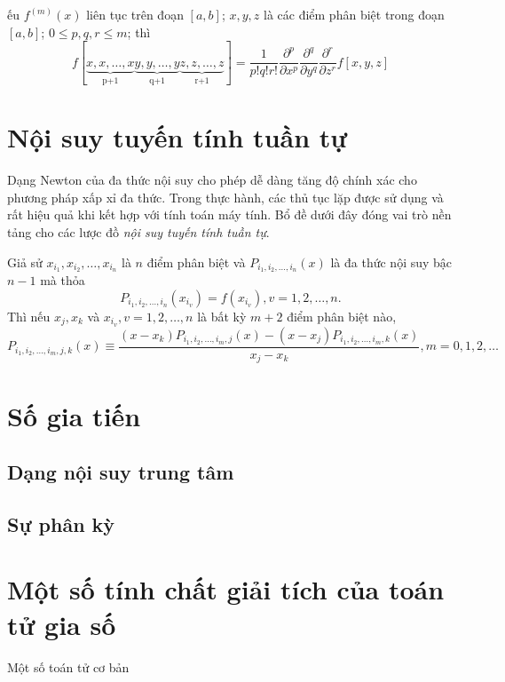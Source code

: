 \begin{coro}
    ếu $f^{(m)}(x)$ liên tục trên đoạn $[a, b]$; $x, y, z$ là các điểm phân biệt trong đoạn $[a,b]$; $0 \leq p,q,r \leq m$; thì
    \begin{equation}
        f[\underset{\text{p+1}}{\underbrace{x,x,\dots,x}}\underset{\text{q+1}}{\underbrace{y,y,\dots,y}}\underset{\text{r+1}}{\underbrace{z,z,\dots,z}}] = \frac{1}{p!q!r!}\frac{\partial^p}{\partial x^p}\frac{\partial^q}{\partial y^q}\frac{\partial^r}{\partial z^r}f[x,y,z]
    \end{equation}
\end{coro}

\section{Nội suy tuyến tính tuần tự}

Dạng Newton của đa thức nội suy cho phép dễ dàng tăng độ chính xác cho phương pháp xấp xỉ đa thức. Trong thực hành, các thủ tục lặp được sử dụng và rất hiệu quả khi kết hợp với tính toán máy tính. Bổ đề dưới đây đóng vai trò nền tảng cho các lược đồ \emph{nội suy tuyến tính tuần tự}.

\begin{lemma}
    Giả sử $x_{i_1}, x_{i_2}, \dots, x_{i_n}$ là $n$ điểm phân biệt và $P_{i_1, i_2, \dots, i_n}(x)$ là đa thức nội suy bậc $n-1$ mà thỏa
    \begin{equation}
        P_{i_1, i_2, \dots, i_n}(x_{i_v}) = f(x_{i_v}), v = 1, 2, \dots, n.
    \end{equation}
    Thì nếu $x_j, x_k$ và $x_{i_v}, v = 1, 2, \dots, n$  là bất kỳ $m+2$ điểm phân biệt nào, 
    \begin{equation}
        P_{i_1, i_2, \dots, i_m, j, k}(x) \equiv
        \frac{(x-x_k)P_{i_1, i_2, \dots, i_m, j}(x) - (x-x_j)P_{i_1, i_2, \dots, i_m, k}(x)}{x_j - x_k}, m = 0, 1, 2, \dots
    \end{equation}
\end{lemma}

\section{Số gia tiến}

\subsection{Dạng nội suy trung tâm}

\subsection{Sự phân kỳ}

\section{Một số tính chất giải tích của toán tử gia số}

Một số toán tử cơ bản